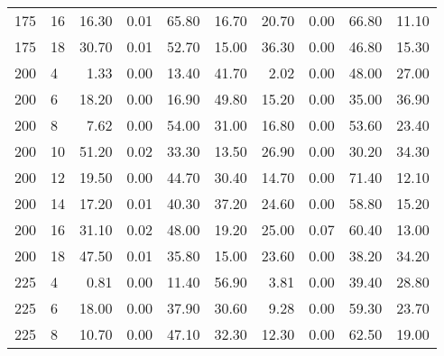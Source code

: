 \begin{table*}[h]
\begin{center}
\begin{tabular} {l l | r r r r | r r r r }
175  &             16  &  16.30  &            0.01             &               65.80  &  16.70  &  20.70  &            0.00             &               66.80  &  11.10  \\
175  &             18  &  30.70  &            0.01             &               52.70  &  15.00  &  36.30  &            0.00             &               46.80  &  15.30  \\
200  &             4   &  1.33   &            0.00             &               13.40  &  41.70  &  2.02   &            0.00             &               48.00  &  27.00  \\
200  &             6   &  18.20  &            0.00             &               16.90  &  49.80  &  15.20  &            0.00             &               35.00  &  36.90  \\
200  &             8   &  7.62   &            0.00             &               54.00  &  31.00  &  16.80  &            0.00             &               53.60  &  23.40  \\
200  &             10  &  51.20  &            0.02             &               33.30  &  13.50  &  26.90  &            0.00             &               30.20  &  34.30  \\
200  &             12  &  19.50  &            0.00             &               44.70  &  30.40  &  14.70  &            0.00             &               71.40  &  12.10  \\
200  &             14  &  17.20  &            0.01             &               40.30  &  37.20  &  24.60  &            0.00             &               58.80  &  15.20  \\
200  &             16  &  31.10  &            0.02             &               48.00  &  19.20  &  25.00  &            0.07             &               60.40  &  13.00  \\
200  &             18  &  47.50  &            0.01             &               35.80  &  15.00  &  23.60  &            0.00             &               38.20  &  34.20  \\
225  &             4   &  0.81   &            0.00             &               11.40  &  56.90  &  3.81   &            0.00             &               39.40  &  28.80  \\
225  &             6   &  18.00  &            0.00             &               37.90  &  30.60  &  9.28   &            0.00             &               59.30  &  23.70  \\
225  &             8   &  10.70  &            0.00             &               47.10  &  32.30  &  12.30  &            0.00             &               62.50  &  19.00  \\

\end{tabular}
\end{center}
\end{table*}
